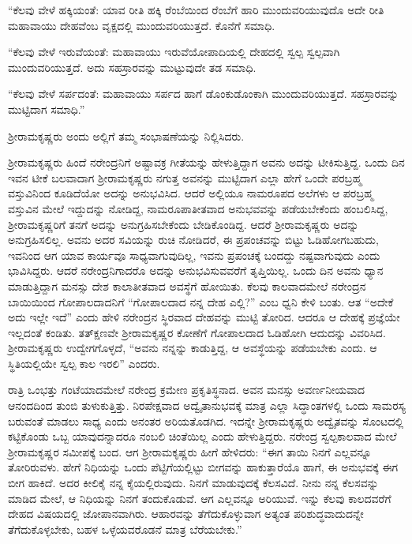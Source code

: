 “ಕೆಲವು ವೇಳೆ ಹಕ್ಕಿಯಂತೆ: ಯಾವ ರೀತಿ ಹಕ್ಕಿ ರೆಂಬೆಯಿಂದ ರೆಂಬೆಗೆ ಹಾರಿ ಮುಂದುವರಿಯುವುದೊ ಅದೇ ರೀತಿ ಮಹಾವಾಯು ದೇಹವೆಂಬ ವೃಕ್ಷದಲ್ಲಿ ಮುಂದುವರಿಯುತ್ತದೆ. ಕೊನೆಗೆ ಸಮಾಧಿ.

“ಕೆಲವು ವೇಳೆ ಇರುವೆಯಂತೆ: ಮಹಾವಾಯು ಇರುವೆಯೋಪಾದಿಯಲ್ಲಿ ದೇಹದಲ್ಲಿ ಸ್ವಲ್ಪ ಸ್ವಲ್ಪವಾಗಿ ಮುಂದುವರಿಯುತ್ತದೆ. ಅದು ಸಹಸ್ರಾರವನ್ನು ಮುಟ್ಟುವುದೇ ತಡ ಸಮಾಧಿ.

“ಕೆಲವು ವೇಳೆ ಸರ್ಪದಂತೆ: ಮಹಾವಾಯು ಸರ್ಪದ ಹಾಗೆ ಡೊಂಕುಡೊಂಕಾಗಿ ಮುಂದುವರಿಯುತ್ತದೆ. ಸಹಸ್ರಾರವನ್ನು ಮುಟ್ಟಿದಾಗ ಸಮಾಧಿ.”

ಶ‍್ರೀರಾಮಕೃಷ್ಣರು ಅಂದು ಅಲ್ಲಿಗೆ ತಮ್ಮ ಸಂಭಾಷಣೆಯನ್ನು ನಿಲ್ಲಿಸಿದರು.

ಶ‍್ರೀರಾಮಕೃಷ್ಣರು ಹಿಂದೆ ನರೇಂದ್ರನಿಗೆ ಅಷ್ಟಾವಕ್ರ ಗೀತೆಯನ್ನು ಹೇಳುತ್ತಿದ್ದಾಗ ಅವನು ಅದನ್ನು ಟೀಕಿಸುತ್ತಿದ್ದ. ಒಂದು ದಿನ ಇವನ ಟೀಕೆ ಬಲವಾದಾಗ ಶ‍್ರೀರಾಮಕೃಷ್ಣರು ನಗುತ್ತ ಅವನನ್ನು ಮುಟ್ಟಿದಾಗ ಎಲ್ಲಾ ಹೇಗೆ ಒಂದೇ ಪರಬ್ರಹ್ಮ ವಸ್ತುವಿನಿಂದ ಕೂಡಿದೆಯೋ ಅದನ್ನು ಅನುಭವಿಸಿದ. ಆದರೆ ಅಲ್ಲಿಯೂ ನಾಮರೂಪದ ಅಲೆಗಳು ಆ ಪರಬ್ರಹ್ಮ ವಸ್ತುವಿನ ಮೇಲೆ ಇದ್ದುದನ್ನು ನೋಡಿದ್ದ, ನಾಮರೂಪಾತೀತವಾದ ಅನುಭವವನ್ನು ಪಡೆಯಬೇಕೆಂದು ಹಂಬಲಿಸಿದ್ದ, ಶ‍್ರೀರಾಮಕೃಷ್ಣರಿಗೆ ತನಗೆ ಅದನ್ನು ಅನುಗ್ರಹಿಸಬೇಕೆಂದು ಬೇಡಿಕೊಂಡಿದ್ದ. ಆದರೆ ಶ‍್ರೀರಾಮಕೃಷ್ಣರು ಅದನ್ನು ಅನುಗ್ರಹಿಸಲಿಲ್ಲ. ಅವನು ಅದರ ಸವಿಯನ್ನು ರುಚಿ ನೋಡಿದರೆ, ಈ ಪ್ರಪಂಚವನ್ನು ಬಿಟ್ಟು ಓಡಿಹೋಗಬಹುದು, ಇವನಿಂದ ಆಗ ಯಾವ ಕಾರ್ಯವೂ ಸಾಧ್ಯವಾಗುವುದಿಲ್ಲ, ಇವನು ಪ್ರಪಂಚಕ್ಕೆ ಬಂದದ್ದು ನಷ್ಟವಾಗುವುದು ಎಂದು ಭಾವಿಸಿದ್ದರು. ಆದರೆ ನರೇಂದ್ರನಿಗಾದರೊ ಅದನ್ನು ಅನುಭವಿಸುವವರೆಗೆ ತೃಪ್ತಿಯಿಲ್ಲ. ಒಂದು ದಿನ ಅವನು ಧ್ಯಾನ ಮಾಡುತ್ತಿದ್ದಾಗ ಮನಸ್ಸು ದೇಶ ಕಾಲಾತೀತವಾದ ಅವಸ್ಥೆಗೆ ಹೋಯಿತು. ಕೆಲವು ಕಾಲವಾದಮೇಲೆ ನರೇಂದ್ರನ ಬಾಯಿಯಿಂದ ಗೋಪಾಲದಾದನಿಗೆ “ಗೋಪಾಲದಾದ ನನ್ನ ದೇಹ ಎಲ್ಲಿ?” ಎಂಬ ಧ್ವನಿ ಕೇಳಿ ಬಂತು. ಆತ “ಅದೇಕೆ ಅದು ಇಲ್ಲೇ ಇದೆ” ಎಂದು ಹೇಳಿ ನರೇಂದ್ರನ ಸ್ಥಿರವಾದ ದೇಹವನ್ನು ಮುಟ್ಟಿ ತೋರಿದ. ಆದರೂ ಆ ದೇಹಕ್ಕೆ ಪ್ರಜ್ಞೆಯೇ ಇಲ್ಲದಂತೆ ಕಂಡಿತು. ತತ್‍ಕ್ಷಣವೇ ಶ‍್ರೀರಾಮಕೃಷ್ಣರ ಕೋಣೆಗೆ ಗೋಪಾಲದಾದ ಓಡಿಹೋಗಿ ಆದುದನ್ನು ವಿವರಿಸಿದ. ಶ‍್ರೀರಾಮಕೃಷ್ಣರು ಉದ್ವೇಗಗೊಳ್ಳದೆ, “ಅವನು ನನ್ನನ್ನು ಕಾಡುತ್ತಿದ್ದ, ಆ ಅವಸ್ಥೆಯನ್ನು ಪಡೆಯಬೇಕು ಎಂದು. ಆ ಸ್ಥಿತಿಯಲ್ಲಿಯೇ ಸ್ವಲ್ಪ ಕಾಲ ಇರಲಿ” ಎಂದರು.

ರಾತ್ರಿ ಒಂಭತ್ತು ಗಂಟೆಯಾದಮೇಲೆ ನರೇಂದ್ರ ಕ್ರಮೇಣ ಪ್ರಕೃತಿಸ್ಥನಾದ. ಅವನ ಮನಸ್ಸು ಅವರ್ಣನೀಯವಾದ ಆನಂದದಿಂದ ತುಂಬಿ ತುಳುಕುತ್ತಿತ್ತು. ನಿರಪೇಕ್ಷವಾದ ಅದ್ವೈತಾನುಭವಕ್ಕೆ ಮಾತ್ರ ಎಲ್ಲಾ ಸಿದ್ಧಾಂತಗಳಲ್ಲಿ ಒಂದು ಸಾಮರಸ್ಯ ಬರುವಂತೆ ಮಾಡಲು ಸಾಧ್ಯ ಎಂದು ಅನಂತರ ಅರಿಯತೊಡಗಿದ. ಇದನ್ನೇ ಶ‍್ರೀರಾಮಕೃಷ್ಣರು ಅದ್ವೈತವನ್ನು ಸೊಂಟದಲ್ಲಿ ಕಟ್ಟಿಕೊಂಡು ಒಬ್ಬ ಯಾವುದನ್ನಾದರೂ ನಂಬಲಿ ಚಿಂತೆಯಿಲ್ಲ ಎಂದು ಹೇಳುತ್ತಿದ್ದರು. ನರೇಂದ್ರ ಸ್ವಲ್ಪಕಾಲವಾದ ಮೇಲೆ ಶ‍್ರೀರಾಮಕೃಷ್ಣರ ಸಮೀಪಕ್ಕೆ ಬಂದ. ಆಗ ಶ‍್ರೀರಾಮಕೃಷ್ಣರು ಹೀಗೆ ಹೇಳಿದರು: “ಈಗ ತಾಯಿ ನಿನಗೆ ಎಲ್ಲವನ್ನೂ ತೋರಿರುವಳು. ಹೇಗೆ ನಿಧಿಯನ್ನು ಒಂದು ಪೆಟ್ಟಿಗೆಯಲ್ಲಿಟ್ಟು ಬೀಗವನ್ನು ಹಾಕುತ್ತಾರೆಯೊ ಹಾಗೆ, ಈ ಅನುಭವಕ್ಕೆ ಈಗ ಬೀಗ ಹಾಕಿದೆ. ಅದರ ಕೀಲಿಕೈ ನನ್ನ ಕೈಯಲ್ಲಿರುವುದು. ನಿನಗೆ ಮಾಡುವುದಕ್ಕೆ ಕೆಲಸವಿದೆ. ನೀನು ನನ್ನ ಕೆಲಸವನ್ನು ಮಾಡಿದ ಮೇಲೆ, ಆ ನಿಧಿಯನ್ನು ನಿನಗೆ ತಂದುಕೊಡುವೆ. ಆಗ ಎಲ್ಲವನ್ನೂ ಅರಿಯುವೆ. ಇನ್ನು ಕೆಲವು ಕಾಲದವರೆಗೆ ದೇಹದ ವಿಷಯದಲ್ಲಿ ಜೋಪಾನವಾಗಿರು. ಆಹಾರವನ್ನು ತೆಗೆದುಕೊಳ್ಳುವಾಗ ಅತ್ಯಂತ ಪರಿಶುದ್ಧವಾದುದನ್ನೇ ತೆಗೆದುಕೊಳ್ಳಬೇಕು, ಬಹಳ ಒಳ್ಳೆಯವರೊಡನೆ ಮಾತ್ರ ಬೆರೆಯಬೇಕು.”


